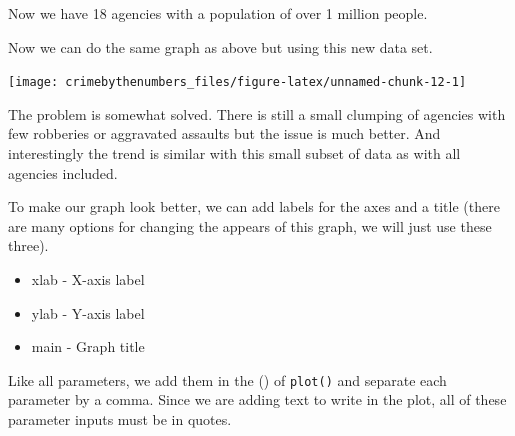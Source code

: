 \documentclass[
]{krantz}
\makeatletter
\newenvironment{Shaded}{\begin{snugshade}}{\end{snugshade}}
\newcommand{\AttributeTok}[1]{\textcolor[rgb]{0.61,0.61,0.61}{#1}}
\newcommand{\FunctionTok}[1]{\textcolor[rgb]{0,0,0}{#1}}
\newcommand{\NormalTok}[1]{#1}
\newcommand{\SpecialCharTok}[1]{\textcolor[rgb]{0,0,0}{#1}}
\newcommand{\StringTok}[1]{\textcolor[rgb]{0.5,0.5,0.5}{#1}}
\providecommand{\tightlist}{%
  \setlength{\itemsep}{0pt}\setlength{\parskip}{0pt}}
\newenvironment{kframe}{%
\medskip{}
\setlength{\fboxsep}{.8em}
 \def\at@end@of@kframe{}%
 \ifinner\ifhmode%
  \def\at@end@of@kframe{\end{minipage}}%
  \begin{minipage}{\columnwidth}%
 \fi\fi%
 \def\FrameCommand##1{\hskip\@totalleftmargin \hskip-\fboxsep
 \colorbox{shadecolor}{##1}\hskip-\fboxsep
     \hskip-\linewidth \hskip-\@totalleftmargin \hskip\columnwidth}%
 \MakeFramed {\advance\hsize-\width
   \@totalleftmargin\z@ \linewidth\hsize
   \@setminipage}}%
 {\par\unskip\endMakeFramed%
 \at@end@of@kframe}
\renewenvironment{Shaded}{\begin{kframe}}{\end{kframe}}
\makeatother
\begin{document}
Now we have 18 agencies with a population of over 1 million people.

Now we can do the same graph as above but using this new data set.

\begin{Shaded}
\end{Shaded}

\begin{center}\texttt{[image: crimebythenumbers\_files/figure-latex/unnamed-chunk-12-1]} \end{center}

The problem is somewhat solved. There is still a small clumping of agencies with few robberies or aggravated assaults but the issue is much better. And interestingly the trend is similar with this small subset of data as with all agencies included.

To make our graph look better, we can add labels for the axes and a title (there are many options for changing the appears of this graph, we will just use these three).

\begin{itemize}
\tightlist
\item
  xlab - X-axis label
\item
  ylab - Y-axis label
\item
  main - Graph title
\end{itemize}

Like all parameters, we add them in the () of \texttt{plot()} and separate each parameter by a comma. Since we are adding text to write in the plot, all of these parameter inputs must be in quotes.

\begin{Shaded}
\end{Shaded}
\end{document}

